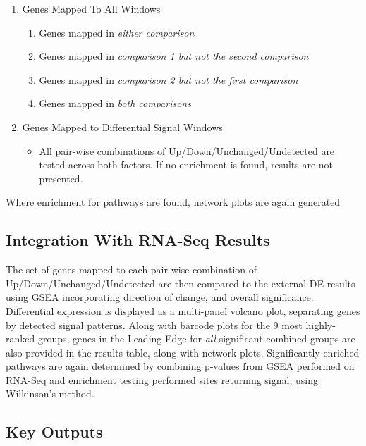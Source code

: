 \documentclass[
]{book}
\providecommand{\tightlist}{%
  \setlength{\itemsep}{0pt}\setlength{\parskip}{0pt}}
\begin{document}
\begin{enumerate}
\def\labelenumi{\arabic{enumi}.}
\tightlist
\item
  Genes Mapped To All Windows

  \begin{enumerate}
  \def\labelenumii{\arabic{enumii}.}
  \tightlist
  \item
    Genes mapped in \emph{either comparison}
  \item
    Genes mapped in \emph{comparison 1 but not the second comparison}
  \item
    Genes mapped in \emph{comparison 2 but not the first comparison}
  \item
    Genes mapped in \emph{both comparisons}
  \end{enumerate}
\item
  Genes Mapped to Differential Signal Windows

  \begin{itemize}
  \tightlist
  \item
    All pair-wise combinations of Up/Down/Unchanged/Undetected are tested across both factors. If no enrichment is found, results are not presented.
  \end{itemize}
\end{enumerate}

Where enrichment for pathways are found, network plots are again generated

\hypertarget{integration-with-rna-seq-results}{%
\subsection*{Integration With RNA-Seq Results}\label{integration-with-rna-seq-results}}

The set of genes mapped to each pair-wise combination of Up/Down/Unchanged/Undetected are then compared to the external DE results using GSEA incorporating direction of change, and overall significance.
Differential expression is displayed as a multi-panel volcano plot, separating genes by detected signal patterns.
Along with barcode plots for the 9 most highly-ranked groups, genes in the Leading Edge for \emph{all} significant combined groups are also provided in the results table, along with network plots.
Significantly enriched pathways are again determined by combining p-values from GSEA performed on RNA-Seq and enrichment testing performed sites returning signal, using Wilkinson's method.

\hypertarget{key-outputs-2}{%
\subsection{Key Outputs}\label{key-outputs-2}}
\end{document}
